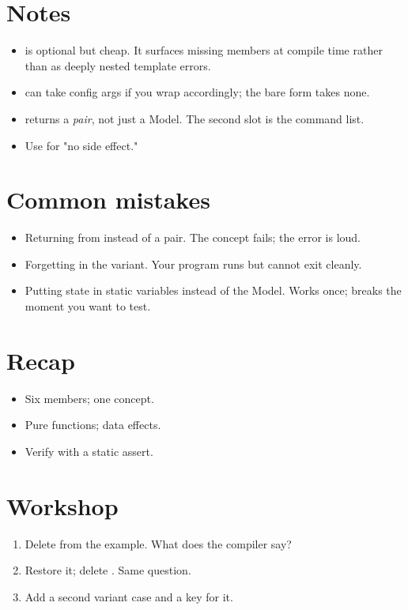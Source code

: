 \section{Notes}

\begin{itemize}[leftmargin=*]
  \item {} is optional but
    cheap. It surfaces missing members at compile time
    rather than as deeply nested template errors.
  \item {} can take config args if you wrap
     accordingly; the bare form takes none.
  \item {} returns a \emph{pair}, not just a
    Model. The second slot is the command list.
  \item Use  for "no side effect."
\end{itemize}

\section{Common mistakes}

\begin{itemize}[leftmargin=*]
  \item Returning  from  instead of
    a pair. The concept fails; the error is loud.
  \item Forgetting  in the variant. Your program
    runs but cannot exit cleanly.
  \item Putting state in static variables instead of the
    Model. Works once; breaks the moment you want to test.
\end{itemize}

\section{Recap}

\begin{recap}
\begin{itemize}[leftmargin=*]
  \item Six members; one concept.
  \item Pure functions; data effects.
  \item Verify with a static assert.
\end{itemize}
\end{recap}

\section*{Workshop}

\begin{enumerate}[leftmargin=*]
  \item Delete  from the example. What does
    the compiler say?
  \item Restore it; delete . Same question.
  \item Add a second variant case and a key for it.
\end{enumerate}
